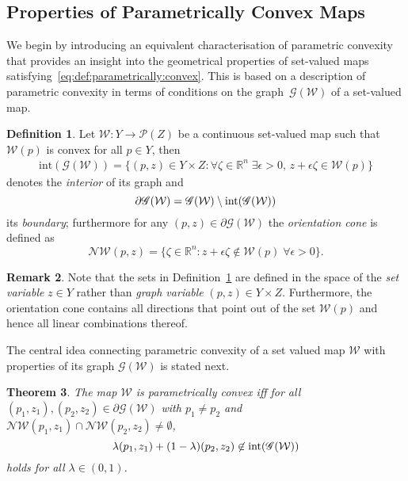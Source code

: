 \documentclass[a4paper, 12pt, twoside]{article}
\newtheorem{thm}{Theorem}[section]
\theoremstyle{definition}
\newtheorem{defn}[thm]{Definition}
\newtheorem{rem}[thm]{Remark}
\numberwithin{equation}{section}
\begin{document}
\subsection{Properties of Parametrically Convex Maps}\label{ssec:properties:of:p:convex:maps}
%
We begin by introducing an equivalent characterisation of parametric convexity that provides an insight into the geometrical properties of 
set-valued maps satisfying~\eqref{eq:def:parametrically:convex}.
%
This is based on a description of parametric convexity in terms of conditions on the graph~$\mathscr G(\mathcal W)$ of a set-valued map.
%
\begin{defn}\label{def:graph:of:map}
Let $\mathcal W:Y\rightarrow \mathscr P(Z)$ be a continuous set-valued map
such that $\mathcal W(p)$ is convex for all $p\in Y$, then 
%
\begin{equation*}\begin{aligned}
\text{int}(\mathscr G(\mathcal W)) = \{(p,z) \in Y\times Z : \forall \zeta\in\mathbb R^n\;\exists \epsilon>0, \, z+\epsilon \zeta\in \mathcal W(p) \}
\end{aligned}\end{equation*}
%
denotes the \emph{interior} of its graph and
%
\[
  \partial \mathscr G(\mathcal W) = \mathscr G(\mathcal W)\setminus \textup{int}(\mathscr G(\mathcal W))
\]
%
its \emph{boundary};
%
furthermore for any $(p,z)\in\partial\mathscr G(\mathcal W)$ the \emph{orientation cone} is defined as 
%
\[
  \mathcal N\mathcal W(p,z) = \{\zeta \in\mathbb R^n: z+\epsilon \zeta \not\in \mathcal W(p)\; \forall \epsilon>0\} .
\]
%
\end{defn}
%
\begin{rem}
%
Note that the sets in Definition~\ref{def:graph:of:map} are defined in the space of the \emph{set variable} $z\in Y$ rather than \emph{graph variable} $(p,z)\in Y\times Z$.
%
Furthermore, the orientation cone contains all directions that point out of the set $\mathcal W(p)$ and hence all linear combinations thereof.
%
\end{rem}
%
The central idea connecting parametric convexity of a set valued map $\mathcal W$ with properties of its graph $\mathscr G(\mathcal W)$ is stated next.
%
\begin{thm}\label{thm:p:convexity:graph}
The map $\mathcal W$ is parametrically convex iff for all $(p_1,z_1), (p_2,z_2)\in\partial\mathscr G(\mathcal W)$
with $p_1\neq p_2$ and $\mathcal N\mathcal W(p_1,z_1)\cap\mathcal N\mathcal W(p_2,z_2)\neq\emptyset$,
%
\begin{equation}\label{eq:graph:def:p:convexity}
\lambda (p_1,z_1) + (1-\lambda) (p_2,z_2) \not\in\textup{int} (\mathscr G(\mathcal W))
\end{equation}
%
holds for all $\lambda\in(0,1)$.
%
\end{thm}
\end{document}
